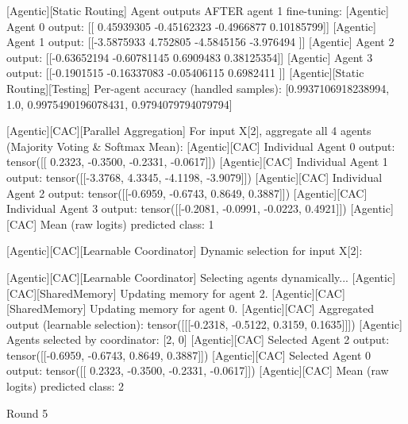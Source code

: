 [Agentic][Static Routing] Agent outputs AFTER agent 1 fine-tuning:
[Agentic] Agent 0 output: [[ 0.45939305 -0.45162323 -0.4966877   0.10185799]]
[Agentic] Agent 1 output: [[-3.5875933  4.752805  -4.5845156 -3.976494 ]]
[Agentic] Agent 2 output: [[-0.63652194 -0.60781145  0.6909483   0.38125354]]
[Agentic] Agent 3 output: [[-0.1901515  -0.16337083 -0.05406115  0.6982411 ]]
[Agentic][Static Routing][Testing] Per-agent accuracy (handled samples): [0.9937106918238994, 1.0, 0.9975490196078431, 0.9794079794079794]

[Agentic][CAC][Parallel Aggregation] For input X[2], aggregate all 4 agents (Majority Voting & Softmax Mean):
[Agentic][CAC] Individual Agent 0 output: tensor([[ 0.2323, -0.3500, -0.2331, -0.0617]])
[Agentic][CAC] Individual Agent 1 output: tensor([[-3.3768,  4.3345, -4.1198, -3.9079]])
[Agentic][CAC] Individual Agent 2 output: tensor([[-0.6959, -0.6743,  0.8649,  0.3887]])
[Agentic][CAC] Individual Agent 3 output: tensor([[-0.2081, -0.0991, -0.0223,  0.4921]])
[Agentic][CAC] Mean (raw logits) predicted class: 1

[Agentic][CAC][Learnable Coordinator] Dynamic selection for input X[2]:

[Agentic][CAC][Learnable Coordinator] Selecting agents dynamically...
[Agentic][CAC][SharedMemory] Updating memory for agent 2.
[Agentic][CAC][SharedMemory] Updating memory for agent 0.
[Agentic][CAC] Aggregated output (learnable selection): tensor([[[-0.2318, -0.5122,  0.3159,  0.1635]]])
[Agentic] Agents selected by coordinator: [2, 0]
[Agentic][CAC] Selected Agent 2 output: tensor([[-0.6959, -0.6743,  0.8649,  0.3887]])
[Agentic][CAC] Selected Agent 0 output: tensor([[ 0.2323, -0.3500, -0.2331, -0.0617]])
[Agentic][CAC] Mean (raw logits) predicted class: 2

Round 5

